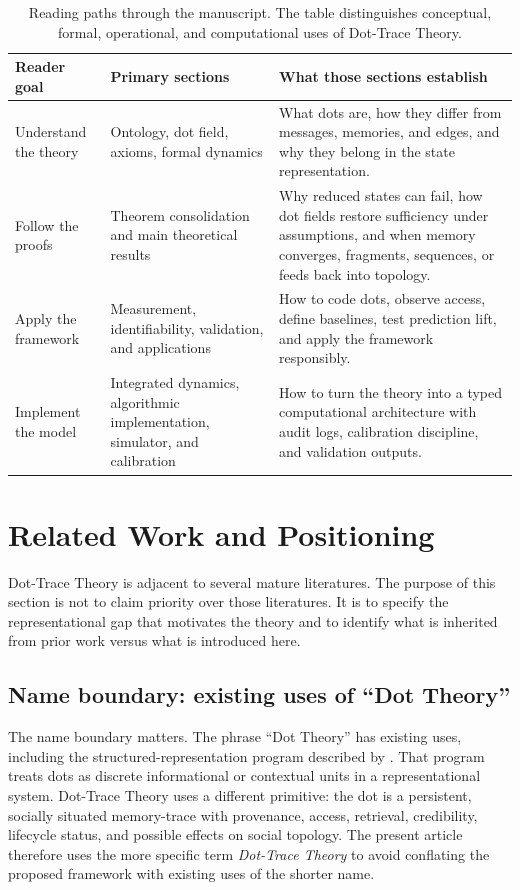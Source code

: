 \documentclass[11pt]{article}
\theoremstyle{remark}
\begin{document}
\begin{table}[htbp]
\centering
\small
\begin{tabular}{L{0.22\textwidth}L{0.34\textwidth}L{0.34\textwidth}}
\toprule
\textbf{Reader goal} & \textbf{Primary sections} & \textbf{What those sections establish}\\
\midrule
Understand the theory & Ontology, dot field, axioms, formal dynamics & What dots are, how they differ from messages, memories, and edges, and why they belong in the state representation.\\
Follow the proofs & Theorem consolidation and main theoretical results & Why reduced states can fail, how dot fields restore sufficiency under assumptions, and when memory converges, fragments, sequences, or feeds back into topology.\\
Apply the framework & Measurement, identifiability, validation, and applications & How to code dots, observe access, define baselines, test prediction lift, and apply the framework responsibly.\\
Implement the model & Integrated dynamics, algorithmic implementation, simulator, and calibration & How to turn the theory into a typed computational architecture with audit logs, calibration discipline, and validation outputs.\\
\bottomrule
\end{tabular}
\caption{Reading paths through the manuscript. The table distinguishes conceptual, formal, operational, and computational uses of Dot-Trace Theory.}
\label{tab:reading-paths}
\end{table}

\section{Related Work and Positioning}\label{related-work-and-positioning}

Dot-Trace Theory is adjacent to several mature literatures. The purpose of this section is not to claim priority over those literatures. It is to specify the representational gap that motivates the theory and to identify what is inherited from prior work versus what is introduced here.

\subsection{Name boundary: existing uses of ``Dot Theory''}\label{name-boundary-existing-dot-theory}

The name boundary matters. The phrase ``Dot Theory'' has existing uses, including the structured-representation program described by \citet{vossenDotTheory}. That program treats dots as discrete informational or contextual units in a representational system. Dot-Trace Theory uses a different primitive: the dot is a persistent, socially situated memory-trace with provenance, access, retrieval, credibility, lifecycle status, and possible effects on social topology. The present article therefore uses the more specific term \emph{Dot-Trace Theory} to avoid conflating the proposed framework with existing uses of the shorter name.
\end{document}
